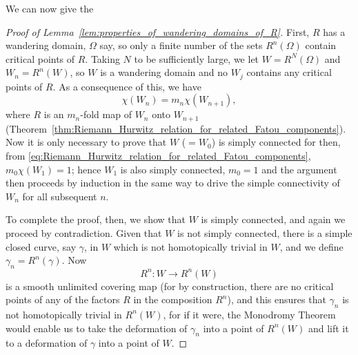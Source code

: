 We can now give the

\begin{proof}[Proof of Lemma~\ref{lem:properties_of_wandering_domains_of_R}]
    First, $R$ has a wandering domain, $\Omega$ say, so only a finite number of
    the sets $R^n(\Omega)$ contain critical points of $R$. Taking $N$ to be
    sufficiently large, we let $W = R^N(\Omega)$ and $W_n = R^n(W)$, so $W$ is a
    wandering domain and no $W_j$ contains any critical points of $R$. As a
    consequence of this, we have
    \begin{equation}
        \label{eq:Riemann_Hurwitz_relation_for_a_wandering_domain}
        \chi(W_n) = m_n \chi(W_{n+1}),
    \end{equation}
    where $R$ is an $m_n$-fold map of $W_n$ onto $W_{n+1}$
    (Theorem~\ref{thm:Riemann_Hurwitz_relation_for_related_Fatou_components}).
    Now it is only necessary to prove that $W$ ($= W_0$) is simply connected for
    then, from \eqref{eq:Riemann_Hurwitz_relation_for_related_Fatou_components},
    $m_0 \chi(W_1) = 1$; hence $W_1$ is also simply connected, $m_0 = 1$ and the
    argument then proceeds by induction in the same way to drive the simple
    connectivity of $W_n$ for all subsequent $n$.

    To complete the proof, then, we show that $W$ is simply connected, and again
    we proceed by contradiction. Given that $W$ is not simply connected, there
    is a simple closed curve, say $\gamma$, in $W$ which is not homotopically
    trivial in $W$, and we define $\gamma_n = R^n(\gamma)$. Now
    \begin{equation*}
        R^n: W \to R^n(W)
    \end{equation*}
    is a smooth unlimited covering map (for by construction, there are no
    critical points of any of the factors $R$ in the composition $R^n$), and
    this ensures that $\gamma_n$ is not homotopically trivial in $R^n(W)$, for
    if it were, the Monodromy Theorem would enable us to take the deformation of
    $\gamma_n$ into a point of $R^n(W)$ and lift it to a deformation of $\gamma$
    into a point of $W$.


\end{proof}
